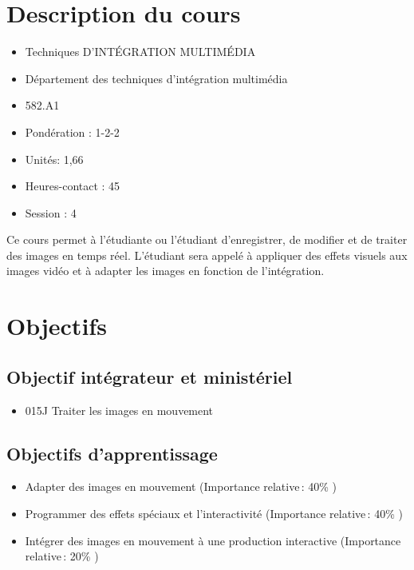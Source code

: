 \documentclass[
]{book}
\providecommand{\tightlist}{%
  \setlength{\itemsep}{0pt}\setlength{\parskip}{0pt}}
\begin{document}
\hypertarget{description-du-cours}{%
\section{Description du cours}\label{description-du-cours}}

\begin{itemize}
\tightlist
\item
  Techniques D'INTÉGRATION MULTIMÉDIA
\item
  Département des techniques d'intégration multimédia
\item
  582.A1
\item
  Pondération : 1-2-2
\item
  Unités: 1,66
\item
  Heures-contact : 45
\item
  Session : 4
\end{itemize}

Ce cours permet à l'étudiante ou l'étudiant d'enregistrer, de modifier et de traiter des images en temps réel.
L'étudiant sera appelé à appliquer des effets visuels aux images vidéo et à adapter les images en fonction de l'intégration.

\hypertarget{objectifs}{%
\section{Objectifs}\label{objectifs}}

\hypertarget{objectif-intuxe9grateur-et-ministuxe9riel}{%
\subsection{Objectif intégrateur et ministériel}\label{objectif-intuxe9grateur-et-ministuxe9riel}}

\begin{itemize}
\tightlist
\item
  015J Traiter les images en mouvement
\end{itemize}

\hypertarget{objectifs-dapprentissage}{%
\subsection{Objectifs d'apprentissage}\label{objectifs-dapprentissage}}

\begin{itemize}
\tightlist
\item
  Adapter des images en mouvement (Importance relative\,: 40\% )
\item
  Programmer des effets spéciaux et l'interactivité (Importance relative\,: 40\% )
\item
  Intégrer des images en mouvement à une production interactive (Importance relative\,: 20\% )
\end{itemize}
\end{document}
